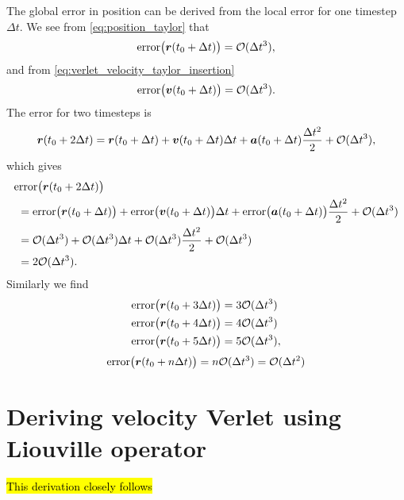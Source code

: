The global error in position can be derived from the local error for one timestep $\Delta t$. We see from \cref{eq:position_taylor} that
\begin{align*}
    \text{error}\big(\boldsymbol{r}(t_0+\Delta t)\big) = \mathcal{O}(\Delta t^3),
\end{align*}
and from \cref{eq:verlet_velocity_taylor_insertion}
\begin{align*}
    \text{error}\big(\boldsymbol{v}(t_0+\Delta t)\big) = \mathcal{O}(\Delta t^3).
\end{align*}
The error for two timesteps is
\begin{align*}
    \boldsymbol{r}(t_0+2\Delta t) 
    &= \boldsymbol{r}(t_0+\Delta t) + \boldsymbol{v}(t_0+\Delta t)\Delta t + \boldsymbol{a}(t_0+\Delta t)\frac{\Delta t^2}{2} + \mathcal{O}(\Delta t^3), \\
\end{align*}
which gives 
\begin{align*}
    &\text{error}\big(\boldsymbol{r}(t_0+2\Delta t)\big) \\
    &~= \text{error}\big(\boldsymbol{r}(t_0+\Delta t)\big) + \text{error}\big(\boldsymbol{v}(t_0+\Delta t)\big)\Delta t + \text{error}\big(\boldsymbol{a}(t_0+\Delta t)\big)\frac{\Delta t^2}{2} + \mathcal{O}(\Delta t^3)\\
    &~= \mathcal{O}(\Delta t^3) + \mathcal{O}(\Delta t^3)\Delta t + \mathcal{O}(\Delta t^3)\frac{\Delta t^2}{2} + \mathcal{O}(\Delta t^3)\\
    &~= 2\mathcal{O}(\Delta t^3).
\end{align*}
Similarly we find
\begin{align*}
    &\text{error}\big(\boldsymbol{r}(t_0+3\Delta t)\big) = 3\mathcal{O}(\Delta t^3) \\
    &\text{error}\big(\boldsymbol{r}(t_0+4\Delta t)\big) = 4\mathcal{O}(\Delta t^3) \\
    &\text{error}\big(\boldsymbol{r}(t_0+5\Delta t)\big) = 5\mathcal{O}(\Delta t^3),
\end{align*}
\begin{align*}
    \text{error}\big(\boldsymbol{r}(t_0 + n\Delta t)\big) = n\mathcal{O}(\Delta t^3) = \mathcal{O}(\Delta t^2)
\end{align*}

\section{Deriving velocity Verlet using Liouville operator}
\newcommand{\Liou}{i\hat{\vec L}}
\newcommand{\Lop}{\hat{\mathcal{U}}}
\hl{This derivation closely follows }\cite[section 4.3.3]{frenkel2001understanding}

